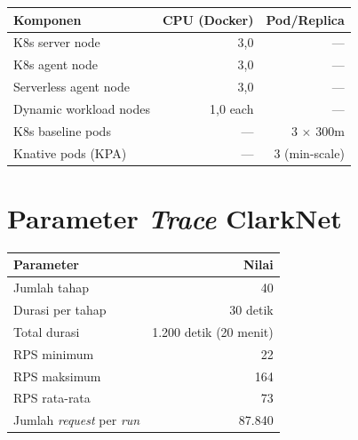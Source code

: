 \begin{table}[htbp]
    \centering
    \begin{tabular}{lrr}
        \toprule
        Komponen & CPU (Docker) & Pod/Replica \\
        \midrule
        K8s server node & 3,0 & --- \\
        K8s agent node & 3,0 & --- \\
        Serverless agent node & 3,0 & --- \\
 Dynamic workload nodes & 1,0 each & --- \\
        K8s baseline pods & --- & 3 $\times$ 300m \\
        Knative pods (KPA) & --- & 3 (min-scale) \\
        \bottomrule
    \end{tabular}
\end{table}

\section*{Parameter \emph{Trace} ClarkNet}

\begin{table}[htbp]
    \centering
    \begin{tabular}{lr}
        \toprule
        Parameter & Nilai \\
        \midrule
        Jumlah tahap & 40 \\
        Durasi per tahap & 30 detik \\
        Total durasi & 1.200 detik (20 menit) \\
        RPS minimum & 22 \\
        RPS maksimum & 164 \\
        RPS rata-rata & 73 \\
        Jumlah \emph{request} per \emph{run} & 87.840 \\
        \bottomrule
    \end{tabular}
\end{table}
